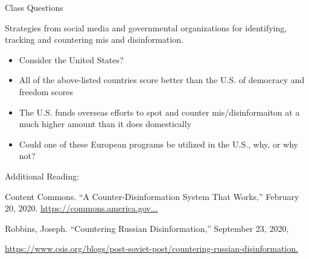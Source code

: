 \documentclass[nobackground,dvipsnames,table]{beamer}
\begin{document}
\begin{frame}{Class Questions}

\begin{minipage}{0.5\textwidth}
    \footnotesize{
        Strategies from social media and governmental organizations for identifying, tracking and countering mis and disinformation.
        \begin{itemize}
            \item Consider the United States? 
            \item All of the above-listed countries score better than the U.S. of democracy and freedom scores 
            \item The U.S. funds overseas efforts to spot and counter mis/disinformaiton at a much higher amount than it does domestically
            \item Could one of these European programs be utilized in the U.S., why, or why not?
        \end{itemize}
    }
\end{minipage}
\hspace{0.05\textwidth}
\begin{minipage}{0.42\textwidth}
\footnotesize{ \raggedright{
    Additional Reading: \newline 
    
    Content Commons. “A Counter-Disinformation System That Works,” February 20, 2020. \href{https://commons.america.gov/article?id=44\&site=content.america.gov.}{https://commons.america.gov...} \newline 
    
    Robbins, Joseph. “Countering Russian Disinformation,” September 23, 2020, }\href{https://www.csis.org/blogs/post-soviet-post/countering-russian-disinformation}{https://www.csis.org/blogs/post-soviet-post/countering-russian-disinformation.}
}
\end{minipage}
\note[]{

}
\end{frame}
\end{document}
